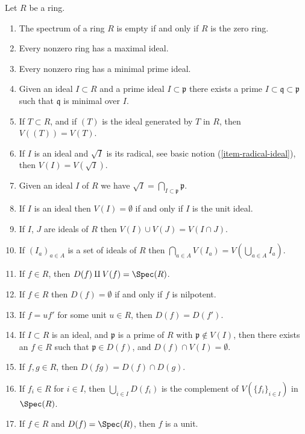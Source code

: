 %
\begin{lemma}
\label{lemma-Zariski-topology}
Let $R$ be a ring.
\begin{enumerate}
\item The spectrum of a ring $R$ is empty if and only if $R$
is the zero ring.
\item Every nonzero ring has a maximal ideal.
\item Every nonzero ring has a minimal prime ideal.
\item Given an ideal $I \subset R$ and a prime ideal
$I \subset \mathfrak p$ there exists a prime
$I \subset \mathfrak q \subset \mathfrak p$ such
that $\mathfrak q$ is minimal over $I$.
\item If $T \subset R$, and if $(T)$ is the ideal generated by
$T$ in $R$, then $V((T)) = V(T)$.
\item If $I$ is an ideal and $\sqrt{I}$ is its radical,
see basic notion (\ref{item-radical-ideal}), then $V(I) = V(\sqrt{I})$.
\item Given an ideal $I$ of $R$ we have $\sqrt{I} =
\bigcap_{I \subset \mathfrak p} \mathfrak p$.
\item If $I$ is an ideal then $V(I) = \emptyset$ if and only
if $I$ is the unit ideal.
\item If $I$, $J$ are ideals of $R$ then $V(I) \cup V(J) =
V(I \cap J)$.
\item If $(I_a)_{a\in A}$ is a set of ideals of $R$ then
$\bigcap_{a\in A} V(I_a) = V(\bigcup_{a\in A} I_a)$.
\item If $f \in R$, then $D(f) \amalg V(f) = \Spec(R)$.
\item If $f \in R$ then $D(f) = \emptyset$ if and only if $f$
is nilpotent.
\item If $f = u f'$ for some unit $u \in R$, then $D(f) = D(f')$.
\item If $I \subset R$ is an ideal, and $\mathfrak p$ is a prime of
$R$ with $\mathfrak p \not\in V(I)$, then there exists an $f \in R$
such that $\mathfrak p \in D(f)$, and $D(f) \cap V(I) = \emptyset$.
\item If $f, g \in R$, then $D(fg) = D(f) \cap D(g)$.
\item If $f_i \in R$ for $i \in I$, then
$\bigcup_{i\in I} D(f_i)$ is the complement of $V(\{f_i \}_{i\in I})$
in $\Spec(R)$.
\item If $f \in R$ and $D(f) = \Spec(R)$, then $f$ is a unit.
\end{enumerate}
\end{lemma}

